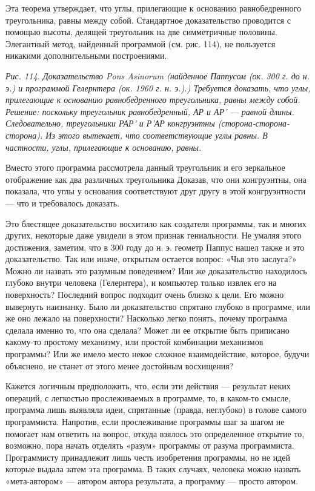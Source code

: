 \documentclass[../main.tex]{subfiles}
\begin{document}
Эта теорема утверждает, что углы, прилегающие к основанию равнобедренного треугольника, равны между собой. Стандартное доказательство проводится с помощью высоты, делящей треугольник на две симметричные половины. Элегантный метод, найденный программой (см. рис. 114), не пользуется никакими дополнительными построениями.

\emph{Рис. 114. Доказательство Pons Asinorum (найденное Паппусом (ок. 300 г. до н. э.) и программой Гелернтера (ок. 1960 г. н. э.).) Требуется доказать, что углы, прилегающие к основанию равнобедренного треугольника, равны между собой. Решение: поскольку треугольник равнобедренный, АР и АР' --- равной длины. Следовательно, треугольники РАР' и Р'АР конгруэнтны (сторона-сторона-сторона). Из этого вытекает, что соответствующие углы равны. В частности, углы, прилегающие к основанию, равны.}

Вместо этого программа рассмотрела данный треугольник и его зеркальное отображение как два различных треугольника Доказав, что они конгруэнтны, она показала, что углы у основания соответствуют друг другу в этой конгруэнтности --- что и требовалось доказать.

Это блестящее доказательство восхитило как создателя программы, так и многих других, некоторые даже увидели в этом признак гениальности. Не умаляя этого достижения, заметим, что в 300 году до н. э. геометр Паппус нашел также и это доказательство. Так или иначе, открытым остается вопрос: «Чья это заслуга?» Можно ли назвать это разумным поведением? Или же доказательство находилось глубоко внутри человека (Гелернтера), и компьютер только извлек его на поверхность? Последний вопрос подходит очень близко к цели. Его можно вывернуть наизнанку. Было ли доказательство спрятано глубоко в программе, или же оно лежало на поверхности? Насколько легко понять, почему программа сделала именно то, что она сделала? Может ли ее открытие быть приписано какому-то простому механизму, или простой комбинации механизмов программы? Или же имело место некое сложное взаимодействие, которое, будучи объяснено, не станет от этого менее достойным восхищения?

Кажется логичным предположить, что, если эти действия --- результат неких операций, с легкостью прослеживаемых в программе, то, в каком-то смысле, программа лишь выявляла идеи, спрятанные (правда, неглубоко) в голове самого программиста. Напротив, если прослеживание программы шаг за шагом не помогает нам ответить на вопрос, откуда взялось это определенное открытие то, возможно, пора начать отделять «разум» программы от разума программиста. Программисту принадлежит лишь честь изобретения программы, но не идей которые выдала затем эта программа. В таких случаях, человека можно назвать «мета-автором» --- автором автора результата, а программу --- просто автором.
\end{document}
